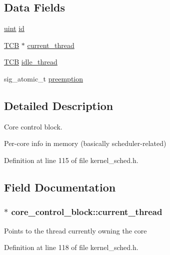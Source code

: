 \subsection*{Data Fields}
\begin{DoxyCompactItemize}
\item 
\hyperlink{bios_8h_a91ad9478d81a7aaf2593e8d9c3d06a14}{uint} \hyperlink{structcore__control__block_a5208867f309bdd1656fd473f38b30bfe}{id}
\item 
\hyperlink{group__scheduler_gaf88d9c946bf70b36a1e8bc34383abfc9}{T\-C\-B} $\ast$ \hyperlink{structcore__control__block_aac649db5b9a99e693ed21c7e610834bf}{current\-\_\-thread}
\item 
\hyperlink{group__scheduler_gaf88d9c946bf70b36a1e8bc34383abfc9}{T\-C\-B} \hyperlink{structcore__control__block_a6dd29dab4a95ce740f45370345408c52}{idle\-\_\-thread}
\item 
sig\-\_\-atomic\-\_\-t \hyperlink{structcore__control__block_a858cde45d4478d73f60e839594b363f4}{preemption}
\end{DoxyCompactItemize}


\subsection{Detailed Description}
Core control block. 

Per-\/core info in memory (basically scheduler-\/related) 

Definition at line 115 of file kernel\-\_\-sched.\-h.



\subsection{Field Documentation}
\hypertarget{structcore__control__block_aac649db5b9a99e693ed21c7e610834bf}{
\subsubsection[{current\-\_\-thread}]{$\ast$ core\-\_\-control\-\_\-block\-::current\-\_\-thread}}\label{structcore__control__block_aac649db5b9a99e693ed21c7e610834bf}
Points to the thread currently owning the core 

Definition at line 118 of file kernel\-\_\-sched.\-h.

